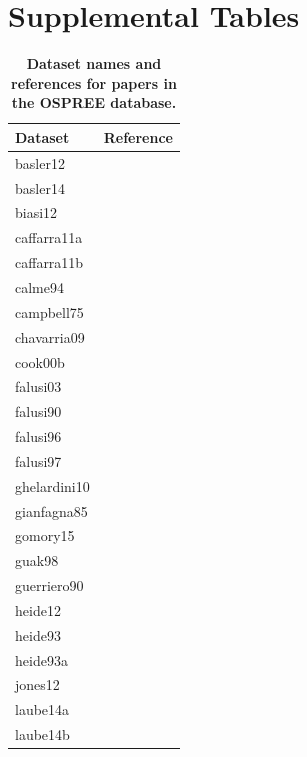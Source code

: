\documentclass{article}
\begin{document}
\section* {Supplemental Tables}
\newpage
\begin{footnotesize} 

\begingroup\footnotesize
\begin{longtable}{p{}p{}}
\caption{\textbf{Dataset names and references for papers in the OSPREE database.}} \\ 
  \hline
Dataset & Reference \\ 
  \hline \endhead  \hline
basler12 & \citet{Basler:2012} \\ 
  basler14 & \citet{Basler:2014aa} \\ 
  biasi12 & \citet{Biasi:2012} \\ 
  caffarra11a & \citet{Caffarra:2011a} \\ 
  caffarra11b & \citet{Caffarra:2011b} \\ 
  calme94 & \citet{Calme:1994aa} \\ 
  campbell75 & \citet{Campbell:1975aa} \\ 
  chavarria09 & \citet{Chavarria:2009aa} \\ 
  cook00b & \citet{Cook:2000aa} \\ 
  falusi03 & \citet{Falusi:2003aa} \\ 
  falusi90 & \citet{Falusi:1990aa} \\ 
  falusi96 & \citet{Falusi:1996aa} \\ 
  falusi97 & \citet{Falusi:1997aa} \\ 
  ghelardini10 & \citet{Ghelardini:2010aa} \\ 
  gianfagna85 & \citet{Gianfagna:1985aa} \\ 
  gomory15 & \citet{Gomory:2015aa} \\ 
  guak98 & \citet{Guak:1998aa} \\ 
  guerriero90 & \citet{guerriero:1990} \\ 
  heide12 & \citet{Heide:2012aa} \\ 
  heide93 & \citet{Heide:1993} \\ 
  heide93a & \citet{Heide:1993a} \\ 
  jones12 & \citet{Jones:2012} \\ 
  laube14a & \citet{Laube:2014a} \\ 
  laube14b & \citet{Laube:2014b} \\ 

\end{longtable}
\end{footnotesize}
\end{document}
